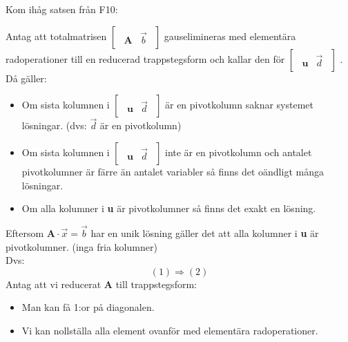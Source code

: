 \begin{Rem}
    Kom ihåg satsen från F10:
    \begin{mdframed}    
    \begin{center}
    	\begin{sats}
    Antag att totalmatrisen
    $\begin{bmatrix}
    \begin{array}{c|c}
        \mathbf{A}& \vec{b}
    \end{array}
    \end{bmatrix}$
     gauselimineras med elementära radoperationer till en reducerad trappstegsform och kallar den för
     $\begin{bmatrix}
    \begin{array}{c|c}
        \mathbf{u}& \vec{d}
    \end{array}
    \end{bmatrix}$
    . Då gäller:
    \begin{itemize}
        \item Om sista kolumnen i $\begin{bmatrix}
    \begin{array}{c|c}
        \mathbf{u}& \vec{d}
    \end{array}
    \end{bmatrix}$ är en pivotkolumn saknar systemet lösningar. (dvs: $\vec{d}$ är en pivotkolumn)
    \item Om sista kolumnen i $\begin{bmatrix}
    \begin{array}{c|c}
        \mathbf{u}& \vec{d}
    \end{array}
    \end{bmatrix}$ inte är en pivotkolumn och antalet pivotkolumner är färre än antalet variabler så finns det oändligt många lösningar.
    \item Om alla kolumner i \textbf{u} är pivotkolumner så finns det exakt en lösning.
    \end{itemize}
\end{sats}
    \end{center}
    \end{mdframed}
\end{Rem}
\noindent
Eftersom $\mathbf{A} \cdot \vec{x} = \vec{b}$ har en unik lösning gäller det att alla kolumner i \textbf{u} är pivotkolumner. (inga fria kolumner)\\
Dvs:
\[
    (1) \Rightarrow (2)
\]
Antag att vi reducerat \textbf{A} till trappstegsform:
\begin{itemize}
	\item Man kan få 1:or på diagonalen.
	\item Vi kan nollställa alla element ovanför med elementära radoperationer.
\end{itemize}
